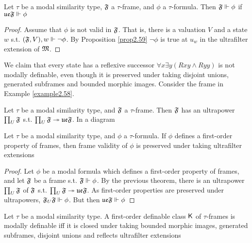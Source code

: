 \documentclass[11pt]{article}
\newcommand{\ue}{\fu\fe}
\begin{document}
\begin{corollary}[]
Let \(\tau\) be a modal similarity type, \(\mathfrak{F}\) a \(\tau\)-frame, and \(\phi\) a
\(\tau\)-formula. Then \(\mathfrak{F}\Vdash\phi\) if \(\ue\fF\Vdash\phi\)
\end{corollary}

\begin{proof}
Assume that \(\phi\) is not valid in \(\mathfrak{F}\). That is, there is a valuation \(V\)
and a state \(w\) s.t. \((\mathfrak{F},V),w\Vdash\neg\phi\). By Proposition
\ref{prop2.59} \(\neg\phi\) is true at \(u_w\) in the ultrafilter extension of
\(\mathfrak{M}\). 
\end{proof}

We claim that every state has a reflexive successor \(\forall x\exists
   y(Rxy\wedge Ryy)\) is not modally definable, even though it is preserved
under taking disjoint unions, generated subframes and bounded morphic images.
Consider the frame in Example \ref{example2.58}.

\begin{theorem}[]
Let \(\tau\) be a modal similarity type, and \(\mathfrak{F}\) a \(\tau\)-frame. Then \(\mathfrak{F}\)
has an ultrapower \(\prod_U\mathfrak{F}\) s.t. \(\prod_U\fF\twoheadrightarrow\ue\fF\).
In a diagram
\begin{center}\end{center}
\end{theorem}

\begin{corollary}[]
Let \(\tau\) be a modal similarity type, and \(\phi\) a \(\tau\)-formula. If \(\phi\) defines a
first-order property of frames, then frame validity of \(\phi\) is preserved under
taking ultrafilter extensions
\end{corollary}

\begin{proof}
Let \(\phi\) be a modal formula which defines a first-order property of frames, and
let \(\mathfrak{F}\) be a frame s.t. \(\mathfrak{F}\Vdash\phi\). By the previous theorem, there
is an ultrapower \(\prod_U\mathfrak{F}\) of \(\mathfrak{F}\) s.t.
\(\prod_U\fF\twoheadrightarrow\ue\fF\). As first-order properties are
preserved under ultrapowers, \(\mathfrak{F}_U\mathfrak{F}\Vdash\phi\). But then \(\ue\fF\Vdash\phi\)
\end{proof}

\begin{theorem}
Let \(\tau\) be a modal similarity type. A first-order definable class \(\textsf{K}\) of
\(\tau\)-frames is modally definable iff it is closed under taking bounded
morphic images, generated subframes, disjoint unions and reflects ultrafilter extensions
\end{theorem}
\end{document}
